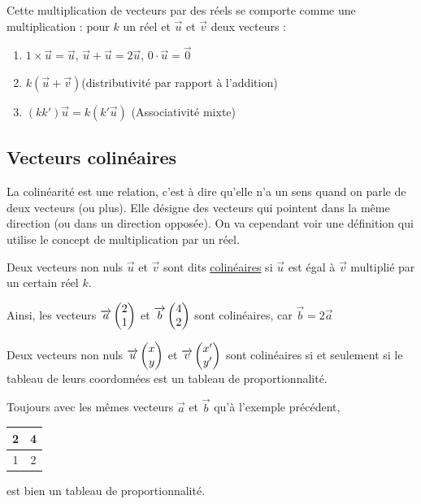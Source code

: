 \documentclass[10pt,a4paper,oneside]{book}
\begin{document}
\begin{prop}
  Cette multiplication de vecteurs par des réels se comporte comme une multiplication : pour $k$ un réel et $\overrightarrow{u}$ et $\overrightarrow{v}$ deux vecteurs : 
  \begin{enumerate}
    \item $1 \times \overrightarrow{u} = \overrightarrow{u}$, $\overrightarrow{u} + \overrightarrow{u} = 2 \overrightarrow{u}$, $0 \cdot \overrightarrow{u}= \overrightarrow{0}$
    \item $k(\overrightarrow{u} + \overrightarrow{v})$(distributivité par rapport à l'addition)
    \item $(kk')\overrightarrow{u} = k(k'\overrightarrow{u})$ (Associativité mixte)
  \end{enumerate}
\end{prop}

\subsection{Vecteurs colinéaires}

La colinéarité est une relation, c'est à dire qu'elle n'a un sens quand on parle de deux vecteurs (ou plus). Elle désigne des vecteurs qui pointent dans la même direction (ou dans un direction opposée).
On va cependant voir une définition qui utilise le concept de multiplication par un réel.


\begin{de}
  Deux vecteurs non nuls $\overrightarrow{u}$ et $\overrightarrow{v}$ sont dits \underline{colinéaires} si $\overrightarrow{u}$ est égal à $\overrightarrow{v}$ multiplié par un certain réel $k$. 
\end{de}

Ainsi, les vecteurs $\overrightarrow{a}  \begin{pmatrix} 2\\ 1 \end{pmatrix}$ et $\overrightarrow{b}  \begin{pmatrix} 4\\ 2 \end{pmatrix}$ sont colinéaires, car $\vec{b}=2\vec{a}$

\begin{prop}
  Deux vecteurs non nuls $\overrightarrow{u}  \begin{pmatrix} x\\ y \end{pmatrix}$ et $\overrightarrow{v}  \begin{pmatrix} x'\\ y' \end{pmatrix}$ sont colinéaires si et seulement si le tableau de leurs coordonnées est un tableau de proportionnalité.
\end{prop}

Toujours avec les mêmes vecteurs $\overrightarrow{a}$ et $\overrightarrow{b}$ qu'à l'exemple précédent,
\begin{tabular}{|c|c|}
  \hline 2 & 4 \\
  \hline 1 & 2\\
  \hline
\end{tabular}  est bien un tableau de proportionnalité.
\end{document}
